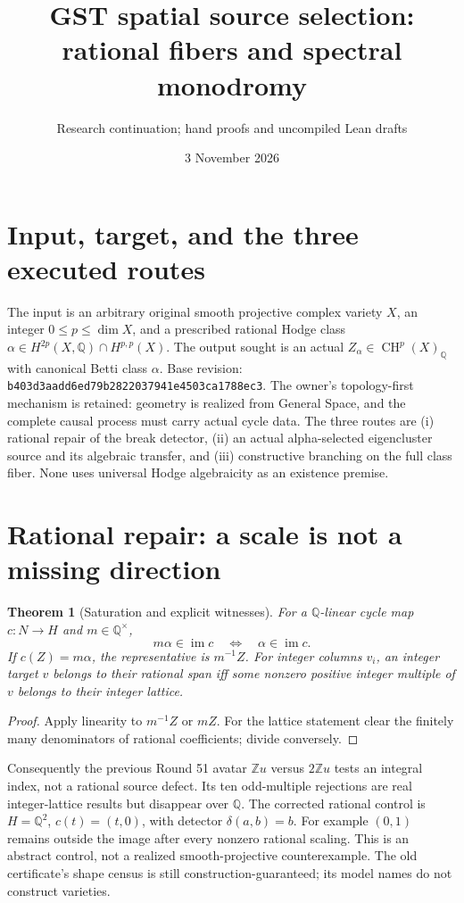 \documentclass[11pt]{article}
\title{GST spatial source selection: rational fibers and spectral monodromy}
\author{Research continuation; hand proofs and uncompiled Lean drafts}
\date{3 November 2026}
\newtheorem{theorem}{Theorem}
\newcommand{\Q}{\mathbb Q}
\newcommand{\CH}{\operatorname{CH}}
\begin{document}
\maketitle

\section{Input, target, and the three executed routes}
The input is an arbitrary original smooth projective complex variety $X$,
an integer $0\leq p\leq\dim X$, and a prescribed rational Hodge class
$\alpha\in H^{2p}(X,\Q)\cap H^{p,p}(X)$. The output sought is an actual
$Z_\alpha\in\CH^p(X)_\Q$ with canonical Betti class $\alpha$.
Base revision: \texttt{b403d3aadd6ed79b2822037941e4503ca1788ec3}.
The owner's topology-first mechanism is retained: geometry is realized from
General Space, and the complete causal process must carry actual cycle data.
The three routes are (i) rational repair of the break detector, (ii) an
actual alpha-selected eigencluster source and its algebraic transfer,
and (iii) constructive branching on the full class fiber.
None uses universal Hodge algebraicity as an existence premise.

\section{Rational repair: a scale is not a missing direction}
\begin{theorem}[Saturation and explicit witnesses]
For a $\Q$-linear cycle map $c:N\to H$ and $m\in\Q^\times$,
\[
 m\alpha\in\operatorname{im}c\quad\Longleftrightarrow\quad
 \alpha\in\operatorname{im}c.
\]
If $c(Z)=m\alpha$, the representative is $m^{-1}Z$.
For integer columns $v_i$, an integer target $v$ belongs to their rational
span iff some nonzero positive integer multiple of $v$ belongs to their
integer lattice.
\end{theorem}
\begin{proof}
Apply linearity to $m^{-1}Z$ or $mZ$. For the lattice statement clear the
finitely many denominators of rational coefficients; divide conversely.
\end{proof}
Consequently the previous Round 51 avatar $\mathbb Zu$ versus $2\mathbb Zu$
tests an integral index, not a rational source defect. Its ten odd-multiple
rejections are real integer-lattice results but disappear over $\Q$.
The corrected rational control is $H=\Q^2$, $c(t)=(t,0)$, with detector
$\delta(a,b)=b$. For example $(0,1)$ remains outside the image after every
nonzero rational scaling. This is an abstract control, not a realized
smooth-projective counterexample. The old certificate's shape census is
still construction-guaranteed; its model names do not construct varieties.
\end{document}
